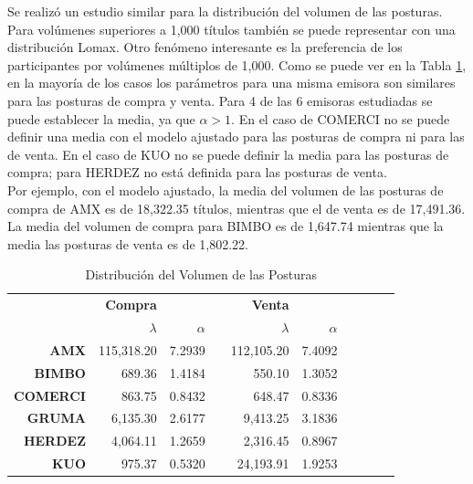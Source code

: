 \documentclass[11pt]{article}
\numberwithin{equation}{section} %
\begin{document}
Se realizó un estudio similar para la distribución del volumen de las posturas. Para volúmenes superiores a 1,000 títulos también se puede representar con una distribución Lomax. Otro fenómeno interesante es la preferencia de los participantes por volúmenes múltiplos de 1,000. Como se puede ver en la Tabla \ref{tab:powervolumen}, en la mayoría de los casos los parámetros para una misma emisora son similares para las posturas de compra y venta. Para 4 de las 6 emisoras estudiadas se puede establecer la media, ya que $\alpha > 1$. En el caso de COMERCI no se puede definir una media con el modelo ajustado para las posturas de compra ni para las de venta. En el caso de KUO no se puede definir la media para las posturas de compra; para HERDEZ no está definida para las posturas de venta.\\

Por ejemplo, con el modelo ajustado, la media del volumen de las posturas de compra de AMX es de 18,322.35 títulos, mientras que el de venta es de 17,491.36. La media del volumen de compra para BIMBO es de 1,647.74 mientras que la media las posturas de venta es de 1,802.22.\\

\begin{table}[htbp]
\centering
\caption{Distribución del Volumen de las Posturas}
\begin{tabular}{r|r|r|r|r|r|r|r|r|r|}
\multicolumn{1}{r}{} & \multicolumn{1}{r}{\textbf{Compra}} & \multicolumn{1}{r}{} & \multicolumn{1}{r}{} & \multicolumn{1}{r}{\textbf{Venta}} & \multicolumn{1}{r}{} \\
\cline{2-3}
\cline{5-6}
& $\lambda$ & $\alpha$ & & $\lambda$ & $\alpha$ \\
\cline{2-3}
\cline{5-6}
\textbf{AMX}   & 115,318.20 & 7.2939 & & 112,105.20 & 7.4092 \\
\textbf{BIMBO} & 689.36 & 1.4184 & & 550.10 & 1.3052 \\
\textbf{COMERCI}   & 863.75 & 0.8432 & & 648.47 & 0.8336 \\
\textbf{GRUMA} & 6,135.30 & 2.6177 & & 9,413.25 & 3.1836 \\
\textbf{HERDEZ}   & 4,064.11 & 1.2659 & & 2,316.45 & 0.8967 \\
\textbf{KUO}   & 975.37 & 0.5320 & & 24,193.91 & 1.9253 \\
\cline{2-3}
\cline{5-6}
\end{tabular}%
\label{tab:powervolumen}%
\end{table}%
\end{document}
